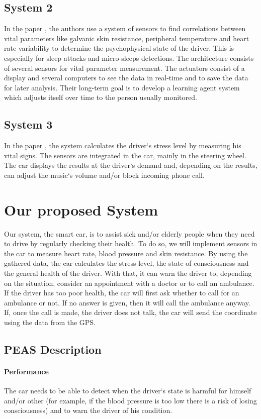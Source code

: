 \subsection{System 2}
\indent
\indent In the paper \cite{Zocchi:07}, the authors use a system of sensors to find correlations between vital parameters like galvanic skin resistance, peripheral temperature and heart rate variability to determine the psychophysical state of the driver. This is especially for sleep attacks and micro-sleeps detections. The architecture consists of several sensors for vital parameter measurement. The actuators consist of a display and several computers to see the data in real-time and to save the data for later analysis. Their long-term goal is to develop a learning agent system which adjusts itself over time to the person usually monitored.
\subsection{System 3}
\indent
\indent In the paper  \cite{angelo:10}, the system calculates the driver`s stress level by measuring his vital signs. The sensors are integrated in the car, mainly in the steering wheel. The car displays the results at the driver`s demand and, depending on the results, can adjust the music`s volume and/or block incoming phone call.

\section{Our proposed System}
\indent
\indent Our system, the smart car, is to assist sick and/or elderly people when they need to drive by regularly checking their health.
To do so, we will implement sensors in the car to measure heart rate, blood pressure and skin resistance. By using the gathered data, the car calculates the stress level, the state of consciousness and the general health of the driver. With that, it can warn the driver to, depending on the situation, consider an appointment with a doctor or to call an ambulance. If the driver has too poor health, the car will first ask whether to call for an ambulance or not. If no answer is given, then it will call the ambulance anyway. If, once the call is made, the driver does not talk, the car will send the coordinate using the data from the GPS.
\subsection{PEAS Description}
\paragraph{Performance} The car needs to be able to detect when the driver`s state is harmful for himself and/or other (for example, if the blood pressure is too low there is a risk of losing consciousness) and to warn the driver of his condition.

